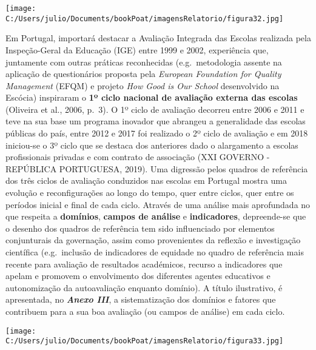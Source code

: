 \documentclass[
]{book}
\begin{document}
\texttt{[image: C:/Users/julio/Documents/bookPoat/imagensRelatorio/figura32.jpg]}

Em Portugal, importará destacar a Avaliação Integrada das Escolas realizada pela Inspeção-Geral da Educação (IGE) entre 1999 e 2002, experiência que, juntamente com outras práticas reconhecidas (e.g.~metodologia assente na aplicação de questionários proposta pela \emph{European Foundation for Quality Management} (EFQM) e projeto \emph{How Good is Our School} desenvolvido na Escócia) inspiraram o \textbf{1º ciclo nacional de avaliação externa das escolas} (Oliveira et al., 2006, p.~3). O 1º ciclo de avaliação decorreu entre 2006 e 2011 e teve na sua base um programa inovador que abrangeu a generalidade das escolas públicas do país, entre 2012 e 2017 foi realizado o 2º ciclo de avaliação e em 2018 iniciou-se o 3º ciclo que se destaca dos anteriores dado o alargamento a escolas profissionais privadas e com contrato de associação (XXI GOVERNO - REPÚBLICA PORTUGUESA, 2019). Uma digressão pelos quadros de referência dos três ciclos de avaliação conduzidos nas escolas em Portugal mostra uma evolução e reconfigurações ao longo do tempo, quer entre ciclos, quer entre os períodos inicial e final de cada ciclo. Através de uma análise mais aprofundada no que respeita a \textbf{domínios}, \textbf{campos de análise} e \textbf{indicadores}, depreende-se que o desenho dos quadros de referência tem sido influenciado por elementos conjunturais da governação, assim como provenientes da reflexão e investigação científica (e.g.~inclusão de indicadores de equidade no quadro de referência mais recente para avaliação de resultados académicos, recurso a indicadores que apelam e promovem o envolvimento dos diferentes agentes educativos e autonomização da autoavaliação enquanto domínio). A título ilustrativo, é apresentada, no \textbf{\emph{Anexo III}}, a sistematização dos domínios e fatores que contribuem para a sua boa avaliação (ou campos de análise) em cada ciclo.

\texttt{[image: C:/Users/julio/Documents/bookPoat/imagensRelatorio/figura33.jpg]}
\end{document}
